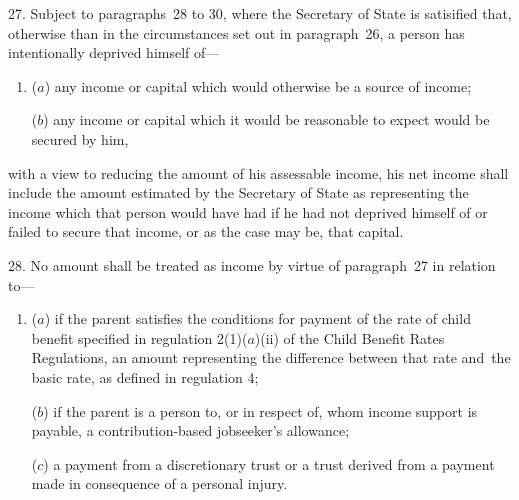 \documentclass[12pt,a4paper]{article}
\begin{document}

\medskip

27.  Subject to paragraphs~28 to 30, where the 
Secretary of State  %
is satisified that, otherwise than in the circumstances set out in paragraph~26, a person has intentionally deprived himself of—
\begin{enumerate}\item[]
($a$) any income or capital which would otherwise be a source of income;

($b$) any income or capital which it would be reasonable to expect would be secured by him,
\end{enumerate}
with a view to reducing the amount of his assessable income, his net income shall include the amount estimated by 
the Secretary of State  %
as representing the income which that person would have had if he had not deprived himself of or failed to secure that income, or as the case may be, that capital.


\medskip

28.  No amount shall be treated as income by virtue of paragraph~27 in relation to—
\begin{enumerate}\item[]

($a$) if the parent satisfies the conditions for payment of the rate of child benefit specified in regulation 2(1)($a$)(ii) of the Child Benefit Rates Regulations, an amount representing the difference between that rate and~the basic rate, as defined in regulation 4;

($b$) if the parent is a person to, or in respect of, whom income support is payable, %
a contribution-based jobseeker’s allowance;  %

($c$) a payment from a discretionary trust or a trust derived from a payment made in consequence of a personal injury.
\end{enumerate}
\end{document}
